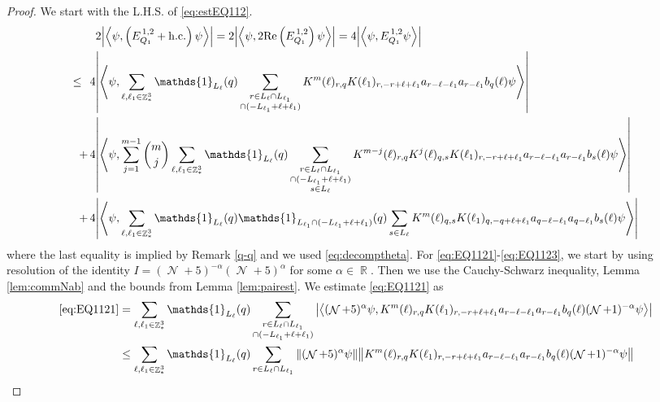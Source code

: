 \documentclass[sn-mathphys, Numbered ,a4paper]{sn-jnl}%
\DeclareMathOperator{\R}{\mathbb{R}}
\DeclareMathOperator{\Z}{\mathbb{Z}}
\DeclareMathOperator{\NN}{\mathcal{N}}
\newcommand{\eva}[1]{\left\langle #1 \right\rangle}
\theoremstyle{plain}
\theoremstyle{definition}
\theoremstyle{remark}
\theoremstyle{plain}
\theoremstyle{definition}
\theoremstyle{remark}
\begin{document}
\begin{proof}
We start with the L.H.S. of \eqref{eq:estEQ112}.
\begin{align}
	&2\abs{\eva{\psi,\left(E^{\,1,2}_{Q_1}+\mathrm{h.c.}\right) \psi }} = 2\abs{\eva{\psi,2\mathrm{Re}\left(E^{\,1,2}_{Q_1}\right) \psi }} = 4\abs{\eva{\psi, E^{\,1,2}_{Q_1} \psi }}\nonumber\\
	\leq\,\;4&\abs{\eva{\psi, \sum\limits_{\ell, \ell_1\in \Z^3_*} \mathds{1}_{L_{\ell}}(q) \sum\limits_{\substack{r\in L_{\ell} \cap L_{\ell_1}\\ \cap (-L_{\ell_1}+\ell+\ell_1)}}  K^m(\ell )_{r,q} K(\ell_1)_{r,-r+\ell+\ell_1} a_{r-\ell-\ell_1} a_{r-\ell_1} b_{q}(\ell) \psi }}\label{eq:EQ1121}\\
	+\,4&   \abs{\eva{\psi, \sum\limits_{j=1}^{m-1} {{m}\choose j} \sum\limits_{\ell, \ell_1\in \Z^3_*}\mathds{1}_{L_{\ell}}(q) \sum\limits_{\substack{r\in L_{\ell} \cap L_{\ell_1}\\ \cap (-L_{\ell_1}+\ell+\ell_1)\\ s \in L_{\ell}}} K^{m-j}(\ell)_{r,q} K^{j}(\ell)_{q,s}K(\ell_1)_{r,-r+\ell+\ell_1} a_{r-\ell-\ell_1} a_{r-\ell_1} b_{s}(\ell) \psi }}\label{eq:EQ1122}\\
	+\,4&\abs{\eva{\psi, \sum\limits_{\ell, \ell_1\in \Z^3_*} \mathds{1}_{L_{\ell}}(q) \mathds{1}_{L_{\ell_1}\cap(-L_{\ell_1}+\ell+\ell_1)}(q) \sum\limits_{s \in L_{\ell}}  K^m(\ell)_{q,s} K(\ell_1)_{q,-q+\ell+\ell_1} a_{q-\ell-\ell_1} a_{q-\ell_1} b_{s}(\ell) \psi }}\label{eq:EQ1123}
\end{align}
where the last equality is implied by Remark \ref{q-q} and we used \eqref{eq:decomptheta}.
For \eqref{eq:EQ1121}-\eqref{eq:EQ1123}, we start by using resolution of the identity $I = (\NN+5)^{-\alpha}(\NN+5)^{\alpha}$ for some $\alpha \in \R$. Then we use the Cauchy-Schwarz inequality, Lemma \ref{lem:commNab} and the bounds from Lemma \ref{lem:pairest}. 
We estimate \eqref{eq:EQ1121} as 
\begin{align}
	 \eqref{eq:EQ1121}
	 &=\sum\limits_{\ell, \ell_1\in \Z^3_*} \mathds{1}_{L_{\ell}}(q) \sum\limits_{\substack{r\in L_{\ell} \cap L_{\ell_1}\\ \cap (-L_{\ell_1}+\ell+\ell_1)}} \abs{\eva{  (\NN+5)^{\alpha} \psi, K^m(\ell )_{r,q} K(\ell_1)_{r,-r+\ell+\ell_1} a_{r-\ell-\ell_1} a_{r-\ell_1} b_{q}(\ell)  (\NN+1)^{-\alpha} \psi }}\nonumber\\
	 &\leq \sum\limits_{\ell, \ell_1\in \Z^3_*} \mathds{1}_{L_{\ell}}(q) \sum\limits_{r\in L_{\ell} \cap L_{\ell_1}} \norm{  (\NN+5)^{\alpha} \psi} \norm{ K^m(\ell )_{r,q} K(\ell_1)_{r,-r+\ell+\ell_1} a_{r-\ell-\ell_1} a_{r-\ell_1} b_{q}(\ell) (\NN+1)^{-\alpha} \psi }\nonumber\\

\end{align}
\end{proof}
\end{document}
